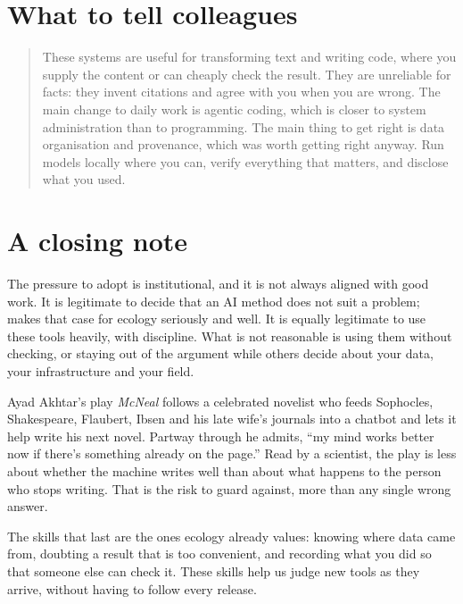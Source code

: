 \section{What to tell colleagues}

\begin{quote}
These systems are useful for transforming text and writing code, where you
supply the content or can cheaply check the result. They are unreliable for
facts: they invent citations and agree with you when you are wrong. The main
change to daily work is agentic coding, which is closer to system administration
than to programming. The main thing to get right is data organisation and
provenance, which was worth getting right anyway. Run models locally where you
can, verify everything that matters, and disclose what you used.
\end{quote}

\section{A closing note}

The pressure to adopt is institutional, and it is not always aligned with good
work. It is legitimate to decide that an AI method does not suit a problem;
\textcite{mishra2026notready} makes that case for ecology seriously and well. It
is equally legitimate to use these tools heavily, with discipline. What is not
reasonable is using them without checking, or staying out of the argument while
others decide about your data, your infrastructure and your field.

Ayad Akhtar's play \emph{McNeal} \parencite{akhtar2024mcneal} follows a
celebrated novelist who feeds Sophocles, Shakespeare, Flaubert, Ibsen and his
late wife's journals into a chatbot and lets it help write his next novel.
Partway through he admits, ``my mind works better now if there's something
already on the page.'' Read by a scientist, the play is less about whether the
machine writes well than about what happens to the person who stops writing.
That is the risk to guard against, more than any single wrong answer.

The skills that last are the ones ecology already values: knowing where data
came from, doubting a result that is too convenient, and recording what you did
so that someone else can check it. These skills help us judge new tools as
they arrive, without having to follow every release.

